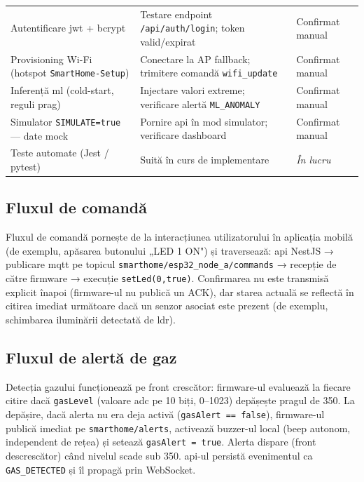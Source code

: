 \begin{table}[H]
\begin{tabular}{p{4.8cm} p{5.4cm} p{2.6cm}}
    \addlinespace
    Autentificare \gls{jwt} + bcrypt &
      Testare endpoint \texttt{/api/auth/login}; token valid/expirat &
      Confirmat manual \\
    \addlinespace
    Provisioning Wi-Fi (hotspot \texttt{SmartHome-Setup}) &
      Conectare la AP fallback; trimitere comandă \texttt{wifi\_update} &
      Confirmat manual \\
    \addlinespace
    Inferență \gls{ml} (cold-start, reguli prag) &
      Injectare valori extreme; verificare alertă \texttt{ML\_ANOMALY} &
      Confirmat manual \\
    \addlinespace
    Simulator \texttt{SIMULATE=true} — date mock &
      Pornire \gls{api} în mod simulator; verificare dashboard &
      Confirmat manual \\
    \addlinespace
    Teste automate (Jest / pytest) &
      Suită în curs de implementare &
      \textit{În lucru} \\
    \bottomrule
  \end{tabular}
\end{table}

\subsection{Fluxul de comandă}

Fluxul de comandă pornește de la interacțiunea utilizatorului în aplicația mobilă (de exemplu,
apăsarea butonului „LED 1 ON") și traversează: \gls{api} NestJS → publicare \gls{mqtt} pe topicul
\texttt{smarthome/esp32\_node\_a/commands} → recepție de către firmware → execuție \texttt{setLed(0,true)}.
Confirmarea nu este transmisă explicit înapoi (firmware-ul nu publică un ACK), dar starea
actuală se reflectă în citirea imediat următoare dacă un senzor asociat este prezent (de exemplu,
schimbarea iluminării detectată de \gls{ldr}).

\subsection{Fluxul de alertă de gaz}

Detecția gazului funcționează pe front crescător: firmware-ul evaluează la fiecare citire dacă
\texttt{gasLevel} (valoare \gls{adc} pe 10 biți, 0–1023) depășește pragul de 350. La depășire,
dacă alerta nu era deja activă (\texttt{gasAlert == false}), firmware-ul publică imediat pe
\texttt{smarthome/alerts}, activează buzzer-ul local (beep autonom, independent de rețea) și
setează \texttt{gasAlert = true}. Alerta dispare (front descrescător) când nivelul scade sub 350.
\gls{api}-ul persistă evenimentul ca \texttt{GAS\_DETECTED} și îl propagă prin WebSocket.

